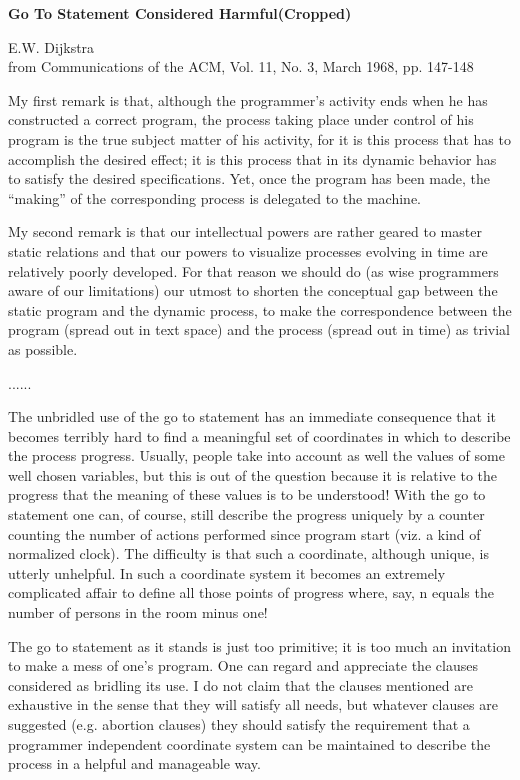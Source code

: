 \begin{pas}
	\begin{center}
		\large \textbf{Go To Statement Considered Harmful(Cropped)}
	\end{center}
	\begin{center}
		E.W. Dijkstra\\
		from Communications of the ACM, Vol. 11, No. 3, March 1968, pp. 147-148
	\end{center}
	My first remark is that, although the programmer's activity ends when he has constructed a correct program, the process taking place under control of his program is the true subject matter of his activity, for it is this process that has to accomplish the desired effect; it is this process that in its dynamic behavior has to satisfy the desired specifications. Yet, once the program has been made, the ``making'' of the corresponding process is delegated to the machine.
	
	My second remark is that our intellectual powers are rather geared to master static relations and that our powers to visualize processes evolving in time are relatively poorly developed. For that reason we should do (as wise programmers aware of our limitations) our utmost to shorten the conceptual gap between the static program and the dynamic process, to make the correspondence between the program (spread out in text space) and the process (spread out in time) as trivial as possible.
	
	......
	
	The unbridled use of the go to statement has an immediate consequence that it becomes terribly hard to find a meaningful set of coordinates in which to describe the process progress. Usually, people take into account as well the values of some well chosen variables, but this is out of the question because it is relative to the progress that the meaning of these values is to be understood! With the go to statement one can, of course, still describe the progress uniquely by a counter counting the number of actions performed since program start (viz. a kind of normalized clock). The difficulty is that such a coordinate, although unique, is utterly unhelpful. In such a coordinate system it becomes an extremely complicated affair to define all those points of progress where, say, n equals the number of persons in the room minus one!

The go to statement as it stands is just too primitive; it is too much an invitation to make a mess of one's program. One can regard and appreciate the clauses considered as bridling its use. I do not claim that the clauses mentioned are exhaustive in the sense that they will satisfy all needs, but whatever clauses are suggested (e.g. abortion clauses) they should satisfy the requirement that a programmer independent coordinate system can be maintained to describe the process in a helpful and manageable way.


\end{pas}

